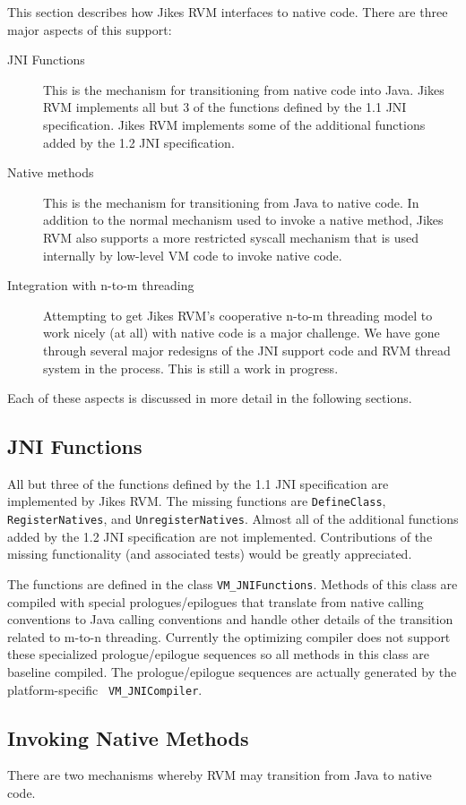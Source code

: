 
This section describes how Jikes RVM interfaces to native code. There
are three major aspects of this support:
\begin{description}
\item[JNI Functions] This is the mechanism for transitioning from
native code into Java. Jikes RVM implements all but 3 of the
functions defined by the 1.1 JNI specification. Jikes RVM implements
some of the additional functions added by the 1.2 JNI
specification.
\item[Native methods] This is the mechanism for transitioning from
Java to native code. In addition to the normal mechanism used to
invoke a native method, Jikes RVM also supports a more restricted
syscall mechanism that is used internally by low-level VM code to
invoke native code. 
\item[Integration with n-to-m threading] Attempting to get Jikes RVM's
cooperative n-to-m threading model to work nicely (at all) with native
code is a major challenge. We have gone through several major
redesigns of the JNI support code and RVM thread system in the
process. This is still a work in progress.
\end{description}
Each of these aspects is discussed in more detail in the following
sections. 

\subsection{JNI Functions}
All but three of the functions defined by the 1.1 JNI specification are
implemented by Jikes RVM. The missing functions are {\tt DefineClass},
{\tt RegisterNatives}, and {\tt UnregisterNatives}.  Almost all of the
additional functions added by the 1.2 JNI specification are not
implemented.  Contributions of the missing functionality (and
associated tests) would be greatly appreciated. 

The functions are defined in the class {\tt VM\_JNIFunctions}. Methods
of this class are compiled with special prologues/epilogues that
translate from native calling conventions to Java calling conventions
and handle other details of the transition related to m-to-n
threading.  Currently the optimizing compiler 
does not support these specialized prologue/epilogue sequences so all
methods in this class are baseline compiled.  The prologue/epilogue
sequences are actually generated by the platform-specific {\tt
VM\_JNICompiler}. 

\subsection{Invoking Native Methods}
There are two mechanisms whereby RVM may transition from Java to native
code.

